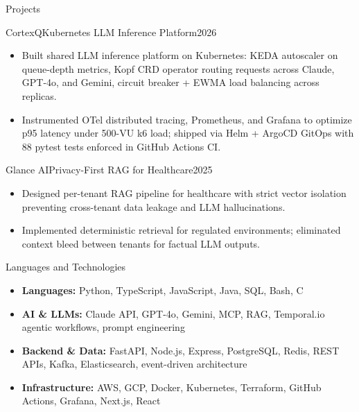 \documentclass[]{mcdowellcv}
\begin{document}
\begin{cvsection}{Projects}
  \begin{cvsubsection}{CortexQ}{Kubernetes LLM Inference Platform}{2026}
    \begin{itemize}
      \item Built shared LLM inference platform on Kubernetes: KEDA autoscaler on queue-depth metrics, Kopf CRD operator routing requests across Claude, GPT-4o, and Gemini, circuit breaker + EWMA load balancing across replicas.
      \item Instrumented OTel distributed tracing, Prometheus, and Grafana to optimize p95 latency under 500-VU k6 load; shipped via Helm + ArgoCD GitOps with 88 pytest tests enforced in GitHub Actions CI.
    \end{itemize}
    \vspace{-1.5pt}
  \end{cvsubsection}

  \begin{cvsubsection}{Glance AI}{Privacy-First RAG for Healthcare}{2025}
    \begin{itemize}
      \item Designed per-tenant RAG pipeline for healthcare with strict vector isolation preventing cross-tenant data leakage and LLM hallucinations.
      \item Implemented deterministic retrieval for regulated environments; eliminated context bleed between tenants for factual LLM outputs.
    \end{itemize}
    \vspace{-1.5pt}
  \end{cvsubsection}

\end{cvsection}

\begin{cvsection}{Languages and Technologies}
  \begin{cvsubsection}{}{}{}
    \begin{itemize}
      \item \textbf{Languages:} Python, TypeScript, JavaScript, Java, SQL, Bash, C
      \item \textbf{AI \& LLMs:} Claude API, GPT-4o, Gemini, MCP, RAG, Temporal.io agentic workflows, prompt engineering
      \item \textbf{Backend \& Data:} FastAPI, Node.js, Express, PostgreSQL, Redis, REST APIs, Kafka, Elasticsearch, event-driven architecture
      \item \textbf{Infrastructure:} AWS, GCP, Docker, Kubernetes, Terraform, GitHub Actions, Grafana, Next.js, React
    \end{itemize}
  \end{cvsubsection}
\end{cvsection}
\end{document}
